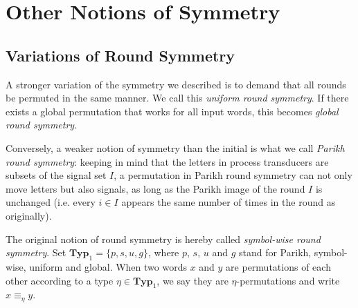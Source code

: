\chapter{Other Notions of Symmetry}
\label{chap:other_notions}

\section{Variations of Round Symmetry}
\newcommand{\RSTYPES}{\ensuremath{\mathbf{Typ}_1}}
\newcommand{\RSTUPS}{\ensuremath{\mathbf{Typ}_2}}

A stronger variation of the symmetry we described is to demand that all rounds be permuted in the same manner. We call this \emph{uniform round symmetry}. If there exists a global permutation that works for all input words, this becomes \emph{global round symmetry}.

Conversely, a weaker notion of symmetry than the initial is what we call \emph{Parikh round symmetry}: keeping in mind that the letters in process transducers are subsets of the signal set $I$, a permutation in Parikh round symmetry can not only move letters but also signals, as long as the Parikh image of the round \WRT $I$ is unchanged (i.e. every $i\in I$ appears the same number of times in the round as originally).

The original notion of round symmetry is hereby called \emph{symbol-wise round symmetry}.
Set $\RSTYPES=\{p, s, u, g\}$, where $p$, $s$, $u$ and $g$ stand for Parikh, symbol-wise, uniform and global. When two words $x$ and $y$ are permutations of each other according to a type $\eta \in \RSTYPES$, we say they are $\eta$-permutations and write $x\equiv_\eta y$.


